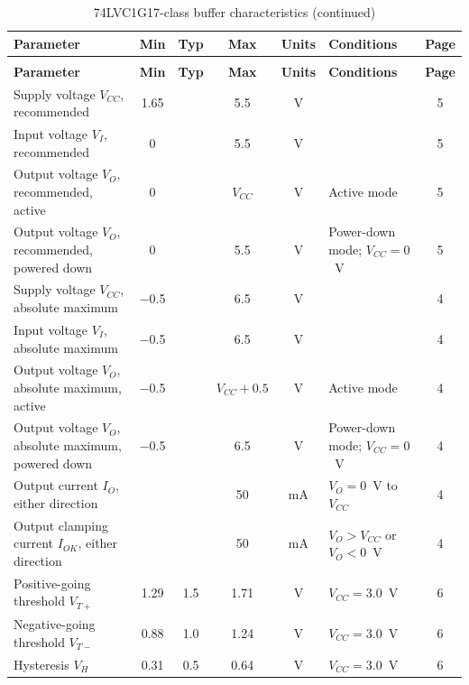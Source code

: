 {\footnotesize
\begin{longtable}{|L{4.4cm}|c|c|c|c|L{3.4cm}|c|}
\caption{74LVC1G17-class buffer characteristics}\label{tab:lvc1g17}\\
\hline
\textbf{Parameter} & \textbf{Min} & \textbf{Typ} & \textbf{Max} & \textbf{Units} & \textbf{Conditions} & \textbf{Page} \\
\hline
\endfirsthead
\caption[]{74LVC1G17-class buffer characteristics (continued)}\\
\hline
\textbf{Parameter} & \textbf{Min} & \textbf{Typ} & \textbf{Max} & \textbf{Units} & \textbf{Conditions} & \textbf{Page} \\
\hline
\endhead
Supply voltage \(V_{CC}\), recommended & \num{1.65} & & \num{5.5} & \si{\volt} & & 5 \\
\hline
Input voltage \(V_I\), recommended & \num{0} & & \num{5.5} & \si{\volt} & & 5 \\
\hline
Output voltage \(V_O\), recommended, active & \num{0} & & \(V_{CC}\) & \si{\volt} & Active mode & 5 \\
\hline
Output voltage \(V_O\), recommended, powered down & \num{0} & & \num{5.5} & \si{\volt} & Power-down mode; \(V_{CC}=0\)~V & 5 \\
\hline
Supply voltage \(V_{CC}\), absolute maximum & \num{-0.5} & & \num{6.5} & \si{\volt} & & 4 \\
\hline
Input voltage \(V_I\), absolute maximum & \num{-0.5} & & \num{6.5} & \si{\volt} & & 4 \\
\hline
Output voltage \(V_O\), absolute maximum, active & \num{-0.5} & & \(V_{CC}+0.5\) & \si{\volt} & Active mode & 4 \\
\hline
Output voltage \(V_O\), absolute maximum, powered down & \num{-0.5} & & \num{6.5} & \si{\volt} & Power-down mode; \(V_{CC}=0\)~V & 4 \\
\hline
Output current \(I_O\), either direction & & & \num{50} & \si{\milli\ampere} & \(V_O=0\)~V to \(V_{CC}\) & 4 \\
\hline
Output clamping current \(I_{OK}\), either direction & & & \num{50} & \si{\milli\ampere} & \(V_O>V_{CC}\) or \(V_O<0\)~V & 4 \\
\hline
Positive-going threshold \(V_{T+}\) & \num{1.29} & \num{1.5} & \num{1.71} & \si{\volt} & \(V_{CC}=3.0\)~V & 6 \\
\hline
Negative-going threshold \(V_{T-}\) & \num{0.88} & \num{1.0} & \num{1.24} & \si{\volt} & \(V_{CC}=3.0\)~V & 6 \\
\hline
Hysteresis \(V_H\) & \num{0.31} & \num{0.5} & \num{0.64} & \si{\volt} & \(V_{CC}=3.0\)~V & 6 \\

\end{longtable}}
